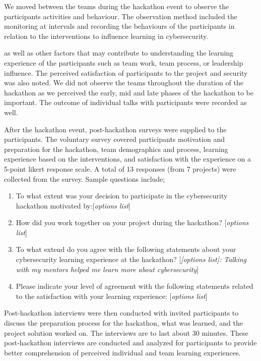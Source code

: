 \documentclass[runningheads]{llncs}
\newcommand{\hr}[1]{\textbf{RQ}$_{\ref{#1}}$}
\begin{document}
We moved between the teams during the hackathon event to observe the participants activities and behaviour.
The observation method included the monitoring at intervals and recording the behaviours of the participants in relation to the interventions to influence learning in cybersecurity.  %

as well as other factors that may contribute to understanding the learning experience of the participants such as team work, team process, or leadership influence. The perceived satisfaction of participants to the project and security was also noted.  We did not observe the teams throughout the duration of the hackathon as we perceived the early, mid and late phases of the hackathon to be important. The outcome of individual talks with participants were recorded as well.

After the hackathon event, post-hackathon surveys were supplied to the participants. The voluntary survey covered participants motivation and preparation for the hackathon, team demographics and process, learning experience based on the interventions, and satisfaction with the experience on a 5-point likert response scale. A total of 13 responses (from 7 projects) were collected from the survey. Sample questions include; 
\begin{enumerate}
    \item To what extent was your decision to participate in the cybersecurity hackathon motivated by:[\textit{options list}]
    \item How did you work together on your project during the hackathon? [\textit{options list}]
    \item To what extend do you agree with the following statements about your cybersecurity learning experience at the hackathon? [\textit{[options list]: Talking with my mentors helped me learn more about cybersecurity}]
    \item Please indicate your level of agreement with the following statements related to the satisfaction with your learning experience: [\textit{options list}]
\end{enumerate}


Post-hackathon interviews were then conducted with invited participants to discuss the preparation process for the hackathon, what was learned, and the project solution worked on. The interviews are to last about 30 minutes. These post-hackathon interviews are conducted and analyzed for participants to provide better comprehension of perceived individual and team learning experiences.
\end{document}
